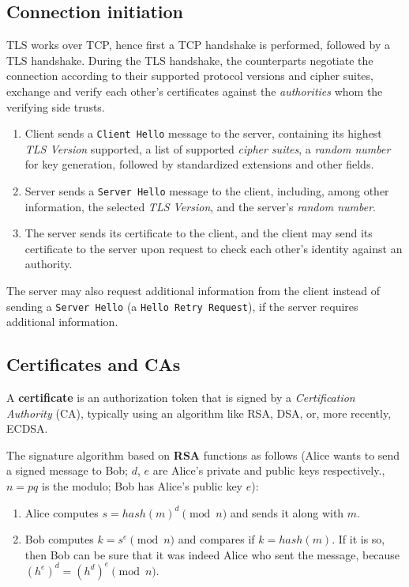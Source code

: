 \documentclass[a4]{report}
\begin{document}
\subsection{Connection initiation}

TLS works over TCP, hence first a TCP handshake is performed, followed by a TLS handshake. During the TLS handshake, the counterparts negotiate the connection according to their supported protocol versions and cipher suites, exchange and verify each other's certificates against the \textit{authorities} whom the verifying side trusts.

\begin{enumerate}
  \item Client sends a \texttt{Client Hello} message to the server, containing its highest \textit{TLS Version} supported, a list of supported \textit{cipher suites}, a \textit{random number} for key generation, followed by standardized extensions and other fields.
  \item Server sends a \texttt{Server Hello} message to the client, including, among other information, the selected \textit{TLS Version}, and the server's \textit{random number}.
  \item The server sends its certificate to the client, and the client may send its certificate to the server upon request to check each other's identity against an authority.
\end{enumerate}

The server may also request additional information from the client instead of sending a \texttt{Server Hello} (a \texttt{Hello Retry Request}), if the server requires additional information\cite{rfc8446}.

\subsection{Certificates and CAs}

A \textbf{certificate} is an authorization token that is signed by a \textit{Certification Authority} (CA), typically using an algorithm like RSA, DSA, or, more recently, ECDSA.

The signature algorithm based on \textbf{RSA} functions as follows (Alice wants to send a signed message to Bob; $d$, $e$ are Alice's private and public keys respectively., $n=pq$ is the modulo; Bob has Alice's public key $e$):

\begin{enumerate}
  \item Alice computes $s=hash(m)^{d}\pmod{n}$ and sends it along with $m$.
  \item Bob computes $k=s^{e} \pmod{n}$ and compares if $k = hash(m)$. If it is so, then Bob can be sure that it was indeed Alice who sent the message, because $(h^{e})^{d}=(h^{d})^{e} \pmod{n}$.
\end{enumerate}
\end{document}
